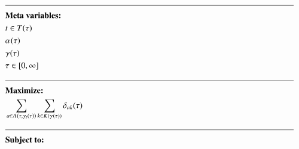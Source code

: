 \begin{alignat}{2}
	& \text{\rule{\linewidth}{0.8pt}} \notag \label{}                                                                                                                                                                                                                                                                                                                                                                     \\ 
	& \textbf{Meta variables:}                                                                                                                                                                         \notag\\
	& \ElementTechnician \in \SetTechnician                                                                                                                                                            \\
	& \VarStrategicWorkOrderAssignment{}{}                                                                                                                                                             \\
	& \VarSupervisorAssignment{}{}                                                                                                                                                                     \\
	& \tau \in [0, \infty]                                                                                                                                                                             \\
	& \text{\rule{\linewidth}{0.4pt}} \notag\\
	& \textbf{Maximize:}                                                                                                                                                                               \notag\\
	& \sum_{\ElementActivity \in \SetActivity{\VarSupervisorAssignment{}{\ElementTechnician}}{}} \sum_{\ElementWorkSegment \in \SetWorkSegment} \VarProcessingTime                                           \\
	& \text{\rule{\linewidth}{0.4pt}} \notag\\
	& \textbf{Subject to:}                                                                                                                                                                             \notag\\

\end{alignat}
